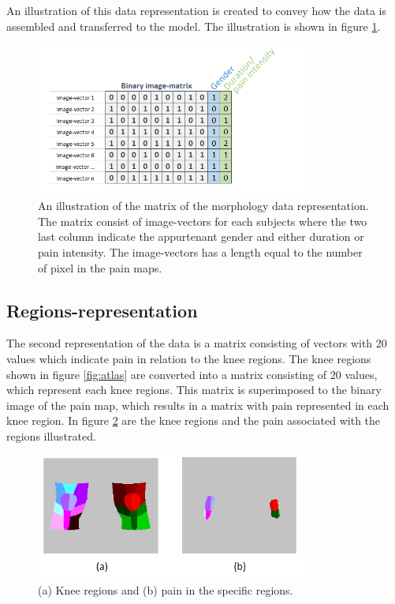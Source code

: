 \noindent
An illustration of this data representation is created to convey how the data is assembled and transferred to the model. The illustration is shown in figure \ref{fig:binmatrix}.

\begin{figure} [H]
\centering
\includegraphics[width=0.8\textwidth]{figures/binaryimagematrix}
\caption{An illustration of the matrix of the morphology data representation. The matrix consist of image-vectors for each subjects where the two last column indicate the appurtenant gender and either duration or pain intensity. The image-vectors has a length equal to the number of pixel in the pain maps.}
\label{fig:binmatrix}
\end{figure}


\subsection{Regions-representation}
The second representation of the data is a matrix consisting of vectors with 20 values which indicate pain in relation to the knee regions.
The knee regions shown in figure \ref{fig:atlas} are converted into a matrix consisting of 20 values, which represent each knee regions. This matrix is superimposed to the binary image of the pain map, which results in a matrix with pain represented in each knee region. In figure \ref{fig:binregions} are the knee regions and the pain associated with the regions illustrated.

\begin{figure} [H]
\centering
\includegraphics[width=0.8\textwidth]{figures/binregions}
\caption{(a) Knee regions and (b) pain in the specific regions.}
\label{fig:binregions}
\end{figure}


